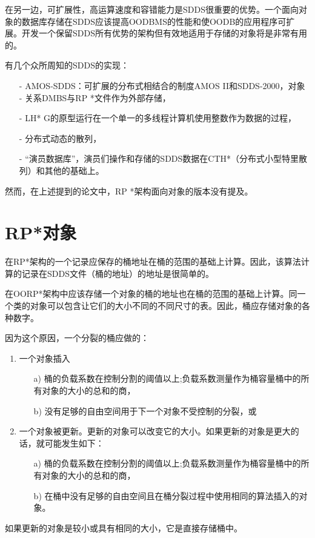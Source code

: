 \documentclass[10pt,a4paper]{article}
\begin{document}
\begin{CJK*}{UTF8}{gkai}
在另一边，可扩展性，高运算速度和容错能力是SDDS很重要的优势\cite{7,8,10,11}。一个面向对象的数据库存储在SDDS应该提高OODBMS的性能和使OODB的应用程序可扩展。开发一个保留SDDS所有优势的架构但有效地适用于存储的对象将是非常有用的。


有几个众所周知的SDDS的实现：
\begin{itemize}
\item[-] AMOS-SDDS：可扩展的分布式相结合的制度AMOS II和SDDS-2000，对象 - 关系DMBS与RP *文件作为外部存储\cite{12,13}，
\item[-] LH* G的原型运行在一个单一的多线程计算机使用整数作为数据的过程\cite{14}，
\item[-] 分布式动态的散列\cite{9}，
\item[-] “演员数据库”，演员们操作和存储的SDDS数据在CTH*（分布式小型特里散列）\cite{15}和其他的基础上。
\end{itemize}
然而，在上述提到的论文\cite{9,12,13,14,15}中，RP *架构面向对象的版本没有提及。


\section{RP*对象}
在RP*架构的一个记录应保存的桶地址在桶\cite{7}的范围的基础上计算。因此，该算法计算的记录在SDDS文件（桶的地址）的地址是很简单的。


在OORP*架构中应该存储一个对象的桶的地址也在桶的范围的基础上计算。同一个类的对象可以包含让它们的大小不同的不同尺寸的表。因此，桶应存储对象的各种数字。


因为这个原因，一个分裂的桶应做的：
\begin{enumerate}
\item 一个对象插入
\begin{enumerate}
\item[a)]	桶的负载系数在控制分割的阈值以上;负载系数测量作为桶容量桶中的所有对象的大小的总和的商，
\item[b)] 	没有足够的自由空间用于下一个对象不受控制的分裂，或
\end{enumerate}
\item 一个对象被更新。更新的对象可以改变它的大小。如果更新的对象是更大的话，就可能发生如下：
\begin{enumerate}
\item[a)]	桶的负载系数在控制分割的阈值以上;负载系数测量作为桶容量桶中的所有对象的大小的总和的商，
\item[b)] 	在桶中没有足够的自由空间且在桶分裂过程中使用相同的算法插入的对象。
\end{enumerate}
\end{enumerate}
如果更新的对象是较小或具有相同的大小，它是直接存储桶中。



\end{CJK*}
\end{document}
